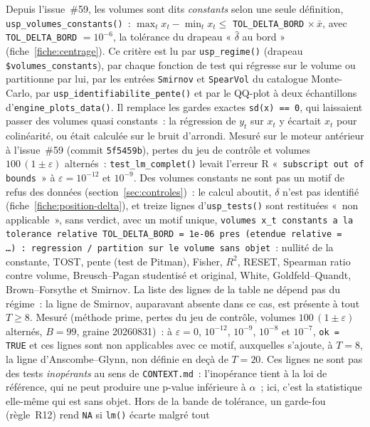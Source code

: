\documentclass[a4paper,11pt]{article}
\newcommand{\code}[1]{\texttt{\small #1}}
\begin{document}
Depuis l'issue~\#59, les volumes sont dits \emph{constants} selon une seule définition,
\code{usp\_volumes\_}\allowbreak\code{constants()}~: $\max_t x_t - \min_t x_t \le$ \code{TOL\_DELTA\_BORD}
$\times\, \bar x$, avec \code{TOL\_DELTA\_BORD} $= 10^{-6}$, la tolérance du drapeau
« $\hat\delta$ au bord » (fiche~\ref{fiche:centrage}). Ce critère est lu par \code{usp\_regime()}
(drapeau \code{\$volumes\_constants}), par chaque fonction de test qui régresse sur le volume ou
partitionne par lui, par les entrées \code{Smirnov} et \code{SpearVol} du catalogue Monte-Carlo,
par \code{usp\_identifiabilite\_pente()} et par le QQ-plot à deux échantillons
d'\code{engine\_plots\_data()}. Il remplace les gardes exactes \code{sd(x) == 0}, qui laissaient
passer des volumes quasi constants~: la régression de $y_t$ sur $x_t$ y écartait $x_t$ pour
colinéarité, ou était calculée sur le bruit d'arrondi. Mesuré sur le moteur antérieur à
l'issue~\#59 (commit \code{5f5459b}), pertes du jeu de contrôle et volumes $100\,(1 \pm \varepsilon)$
alternés~: \code{test\_lm\_complet()} levait l'erreur R «~\code{subscript out of bounds}~» à
$\varepsilon = 10^{-12}$ et $10^{-9}$. Des volumes constants ne sont pas un motif de refus des
données (section~\ref{sec:controles})~: le calcul aboutit, $\delta$ n'est pas identifié
(fiche~\ref{fiche:position-delta}), et treize lignes d'\code{usp\_tests()} sont restituées
«~non applicable~», sans verdict, avec un motif unique, \code{volumes x\_t constants a la tolerance
relative TOL\_DELTA\_BORD = 1e-06 pres (etendue relative = \dots)~: regression / partition sur le
volume sans objet}~: nullité de la constante, TOST, pente (test de Pitman), Fisher, $R^2$, RESET,
Spearman ratio contre volume, Breusch--Pagan studentisé et original, White, Goldfeld--Quandt,
Brown--Forsythe et Smirnov. La liste des lignes de la table ne dépend pas du régime~: la ligne de
Smirnov, auparavant absente dans ce cas, est présente à tout $T \ge 8$. Mesuré (méthode prime,
pertes du jeu de contrôle, volumes $100\,(1 \pm \varepsilon)$ alternés, $B = 99$, graine
20260831)~: à $\varepsilon = 0$, $10^{-12}$, $10^{-9}$, $10^{-8}$ et $10^{-7}$, \code{ok = TRUE}
et ces lignes sont non applicables avec ce motif, auxquelles s'ajoute, à $T = 8$, la ligne
d'Anscombe--Glynn, non définie en deçà de $T = 20$. Ces lignes ne sont pas des tests
\emph{inopérants} au sens de \code{CONTEXT.md}~: l'inopérance tient à la loi de référence, qui ne
peut produire une p-value inférieure à $\alpha$~; ici, c'est la statistique elle-même qui est sans
objet. Hors de la bande de tolérance, un garde-fou (règle~R12) rend \code{NA} si \code{lm()} écarte malgré tout
\end{document}
